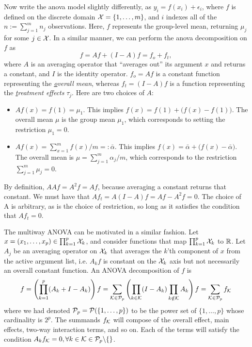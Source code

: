 Now write the \gls*{anova} model slightly differently, as $y_{i} = f(x_i) + \epsilon_{i}$, where $f$ is defined on the discrete domain ${\mathcal X} = \{1,\dots,m\}$, and $i$ indexes all of the $n := \sum_{j=1}^m n_j$ observations.
Here, $f$ represents the group-level mean, returning $\mu_j$ for some $j\in{\mathcal X}$.
In a similar manner, we can perform the \gls*{anova} decomposition on $f$ as
\[
  f = Af + (I-A)f = f_o + f_t,
\]
where $A$ is an averaging operator that ``averages out'' its argument $x$ and returns a constant, and $I$ is the identity operator.
$f_o = Af$ is a constant function representing the \textit{\underline{o}verall mean}, whereas $f_t = (I - A)f$ is a function representing the \textit{\underline{t}reatment effects} $\tau_j$.
Here are two choices of $A$:
\begin{itemize}
  \item {\boldmath$Af(x) = f(1) = \mu_1$}. This implies $f(x) = f(1) + \big(f(x) - f(1)\big)$. The overall mean $\mu$ is the group mean $\mu_1$, which corresponds to setting the restriction $\mu_1=0$.
  \item {\boldmath$Af(x) = \sum_{x=1}^m f(x) / m =: \bar \alpha$}. This implies $f(x) = \bar \alpha + \big( f(x) - \bar \alpha \big)$. The overall mean is $\mu = \sum_{j=1}^m \alpha_j/m$, which corresponds to the restriction $\sum_{j=1}^m \mu_j = 0$.
\end{itemize}
By definition, $AAf = A^2f = Af$, because averaging a constant returns that constant.
We must have that $Af_t = A(I - A)f = Af - A^2f = 0$.
The choice of A is arbitrary, as is the choice of restriction, so long as it satisfies the condition that $Af_t = 0$.

The multiway ANOVA can be motivated in a similar fashion. 
Let $x = (x_1,\dots,x_p) \in \prod_{k=1}^p {\mathcal X}_k$, and consider functions that map $\prod_{k=1}^p {\mathcal X}_k$ to $\mathbb{R}$.
Let $A_j$ be an averaging operator on ${\mathcal X}_k$ that averages the $k$'th component of $x$ from the active argument list, i.e. $A_kf$ is constant on the ${\mathcal X}_k$ axis but not necessarily an overall constant function.
An ANOVA decomposition of $f$ is
\begin{equation}
  f = \left( \prod_{k=1}^p (A_k + I - A_k) \right)f = \sum_{{\mathcal K}\in{\mathcal P}_p} \left( \prod_{k\in{\mathcal K}} (I - A_k) \prod_{k\notin{\mathcal K}} A_k \right)f = \sum_{{\mathcal K}\in{\mathcal P}_p} f_{\mathcal K}
\end{equation}
where we had denoted ${\mathcal P}_p = {\mathcal P}(\{1,\dots,p\})$ to be the power set of $\{1,\dots,p\}$ whose cardinality is $2^p$.
The summands $f_{\mathcal K}$ will compose of the overall effect, main effects, two-way interaction terms, and so on.
Each of the terms will satisfy the condition $A_kf_{\mathcal K} = 0, \forall k \in {\mathcal K} \in {\mathcal P}_p \backslash \{\}$.

